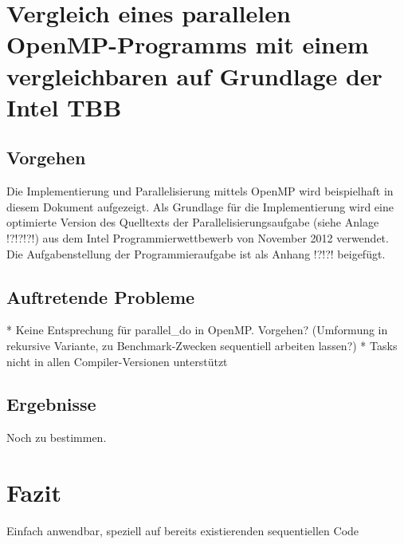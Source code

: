 \documentclass[11pt]{scrartcl}
\begin{document}

\pagebreak %



\section{Vergleich eines parallelen OpenMP-Programms mit einem vergleichbaren auf Grundlage der Intel TBB}

\subsection{Vorgehen}

Die Implementierung und Parallelisierung mittels OpenMP wird beispielhaft in diesem Dokument aufgezeigt. Als Grundlage für die Implementierung wird eine optimierte Version des Quelltexts der Parallelisierungsaufgabe (siehe Anlage !?!?!?!) aus dem Intel Programmierwettbewerb von November 2012 verwendet. Die Aufgabenstellung der Programmieraufgabe ist als Anhang !?!?! beigefügt. 
\cite{openmp08}
\subsection{Auftretende Probleme}

  * Keine Entsprechung für parallel\_do in OpenMP. Vorgehen? (Umformung in rekursive Variante, zu Benchmark-Zwecken sequentiell arbeiten lassen?)
  * Tasks nicht in allen Compiler-Versionen unterstützt

\subsection{Ergebnisse}

Noch zu bestimmen.

\section{Fazit}

Einfach anwendbar, speziell auf bereits existierenden sequentiellen Code
\end{document}
